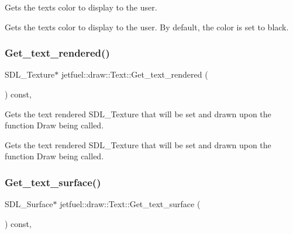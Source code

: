 Gets the text\textquotesingle{}s color to display to the user. 

Gets the text\textquotesingle{}s color to display to the user. By default, the color is set to black. \mbox{\label{classjetfuel_1_1draw_1_1Text_a127d078edc906adec8183d825abb5b23}} 
\subsubsection{\texorpdfstring{Get\+\_\+text\+\_\+rendered()}{Get\_text\_rendered()}}
{\footnotesize\ttfamily S\+D\+L\+\_\+\+Texture$\ast$ jetfuel\+::draw\+::\+Text\+::\+Get\+\_\+text\+\_\+rendered (\begin{DoxyParamCaption}{ }\end{DoxyParamCaption}) const\hspace{0.3cm}{\ttfamily [inline]}, {\ttfamily [protected]}}



Gets the text rendered S\+D\+L\+\_\+\+Texture that will be set and drawn upon the function Draw being called. 

Gets the text rendered S\+D\+L\+\_\+\+Texture that will be set and drawn upon the function Draw being called. \mbox{\label{classjetfuel_1_1draw_1_1Text_ab1b5195b8431f794aad7156583992dc9}} 
\subsubsection{\texorpdfstring{Get\+\_\+text\+\_\+surface()}{Get\_text\_surface()}}
{\footnotesize\ttfamily S\+D\+L\+\_\+\+Surface$\ast$ jetfuel\+::draw\+::\+Text\+::\+Get\+\_\+text\+\_\+surface (\begin{DoxyParamCaption}{ }\end{DoxyParamCaption}) const\hspace{0.3cm}{\ttfamily [inline]}, {\ttfamily [protected]}}



